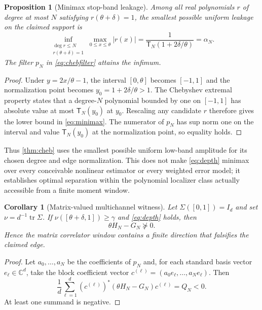 \documentclass[11pt]{article}
\newtheorem{proposition}[theorem]{Proposition}
\newtheorem{corollary}[theorem]{Corollary}
\theoremstyle{definition}
\theoremstyle{remark}
\newcommand{\C}{\mathbb C}
\newcommand{\tr}{\operatorname{tr}}
\begin{document}
\begin{proposition}[Minimax stop-band leakage]           \label{prop:minimax}
Among all real polynomials $r$ of degree at most $N$ satisfying
$r(\theta+\delta)=1$, the smallest possible uniform leakage on the claimed
support is
\begin{equation}
 \inf_{\substack{\deg r\leq N\\r(\theta+\delta)=1}}
 \max_{0\leq x\leq\theta}|r(x)|
 =\frac1{\mathsf T_N(1+2\delta/\theta)}=\alpha_N.       \label{eq:minimax}
\end{equation}
The filter $p_N$ in \cref{eq:chebfilter} attains the infimum.
\end{proposition}

\begin{proof}
Under $y=2x/\theta-1$, the interval $[0,\theta]$ becomes $[-1,1]$ and the
normalization point becomes $y_0=1+2\delta/\theta>1$.  The Chebyshev extremal
property states that a degree-$N$ polynomial bounded by one on $[-1,1]$ has
absolute value at most $\mathsf T_N(y_0)$ at $y_0$.  Rescaling any candidate
$r$ therefore gives the lower bound in \cref{eq:minimax}.  The numerator of
$p_N$ has sup norm one on the interval and value
$\mathsf T_N(y_0)$ at the normalization point, so equality holds.
\end{proof}

Thus \cref{thm:cheb} uses the smallest possible uniform low-band amplitude for
its chosen degree and edge normalization.  This does not make
\cref{eq:depth} minimax over every conceivable nonlinear estimator or every
weighted error model; it establishes optimal separation within the polynomial
localizer class actually accessible from a finite moment window.

\begin{corollary}[Matrix-valued multichannel witness]    \label{cor:matrixcheb}
Let $\Sigma([0,1])=I_d$ and set
$\nu=d^{-1}\tr\Sigma$.  If
$\nu([\theta+\delta,1])\geq\gamma$ and \cref{eq:depth} holds, then
\begin{equation}
 \theta H_N-G_N\not\succeq0.
\end{equation}
Hence the matrix correlator window contains a finite direction that falsifies
the claimed edge.
\end{corollary}

\begin{proof}
Let $a_0,\ldots,a_N$ be the coefficients of $p_N$ and, for each standard basis
vector $e_\ell\in\C^d$, take the block coefficient vector
$c^{(\ell)}=(a_0e_\ell,\ldots,a_Ne_\ell)$.  Then
\[
 \frac1d\sum_{\ell=1}^d
 (c^{(\ell)})^*(\theta H_N-G_N)c^{(\ell)}=Q_N<0.
\]
At least one summand is negative.
\end{proof}
\end{document}
